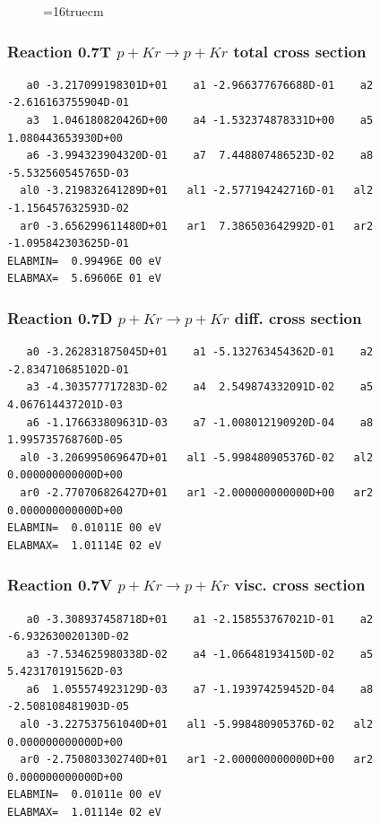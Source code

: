 \documentclass[12pt,dvips]{article}
\begin{document}
\begin{figure} \label{0.6}
\epsfxsize=16truecm
\end{figure}
\newpage



\subsubsection{
Reaction 0.7T   $ p + Kr \rightarrow p + Kr $ total cross
section }



\begin{small}\begin{verbatim}
   a0 -3.217099198301D+01    a1 -2.966377676688D-01    a2 -2.616163755904D-01
   a3  1.046180820426D+00    a4 -1.532374878331D+00    a5  1.080443653930D+00
   a6 -3.994323904320D-01    a7  7.448807486523D-02    a8 -5.532560545765D-03
  al0 -3.219832641289D+01   al1 -2.577194242716D-01   al2 -1.156457632593D-02
  ar0 -3.656299611480D+01   ar1  7.386503642992D-01   ar2 -1.095842303625D-01
ELABMIN=  0.99496E 00 eV
ELABMAX=  5.69606E 01 eV
\end{verbatim}\end{small}

\subsubsection{
Reaction 0.7D    $p + Kr \rightarrow p + Kr  $ diff. cross
section }


\begin{small}\begin{verbatim}
   a0 -3.262831875045D+01    a1 -5.132763454362D-01    a2 -2.834710685102D-01
   a3 -4.303577717283D-02    a4  2.549874332091D-02    a5  4.067614437201D-03
   a6 -1.176633809631D-03    a7 -1.008012190920D-04    a8  1.995735768760D-05
  al0 -3.206995069647D+01   al1 -5.998480905376D-02   al2  0.000000000000D+00
  ar0 -2.770706826427D+01   ar1 -2.000000000000D+00   ar2  0.000000000000D+00
ELABMIN=  0.01011E 00 eV
ELABMAX=  1.01114E 02 eV
\end{verbatim}\end{small}

\subsubsection{
Reaction 0.7V   $ p + Kr \rightarrow p + Kr  $ visc. cross
section }


\begin{small}\begin{verbatim}
   a0 -3.308937458718D+01    a1 -2.158553767021D-01    a2 -6.932630020130D-02
   a3 -7.534625980338D-02    a4 -1.066481934150D-02    a5  5.423170191562D-03
   a6  1.055574923129D-03    a7 -1.193974259452D-04    a8 -2.508108481903D-05
  al0 -3.227537561040D+01   al1 -5.998480905376D-02   al2  0.000000000000D+00
  ar0 -2.750803302740D+01   ar1 -2.000000000000D+00   ar2  0.000000000000D+00
ELABMIN=  0.01011e 00 eV
ELABMAX=  1.01114e 02 eV
\end{verbatim}\end{small}
\end{document}
